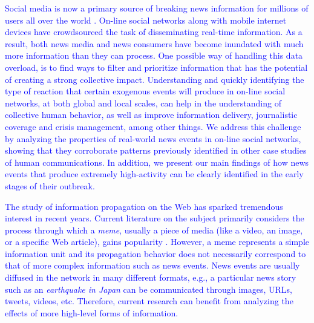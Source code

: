 \documentclass[10pt,letterpaper]{article}
\begin{document}
\textcolor{blue}{Social media is now a primary source of breaking news information
for millions of users all over the world \cite{Kwak:2010}. On-line
social networks along with mobile internet devices have crowdsourced
the task of disseminating real-time information. As a result, both
news media and news consumers have become inundated with much more
information than they can process. One possible way of handling this data overload, is
to find ways to filter and prioritize information that has the
potential of creating a strong collective impact. Understanding and
quickly identifying the type of reaction that certain exogenous events will produce
in on-line social networks, at both global and local scales, can help
in the understanding of collective human behavior, as well as
improve information delivery, journalistic coverage and
crisis management, among other things. We
address this challenge by analyzing the properties of real-world news
events in on-line social networks, showing that they corroborate patterns
previously identified in other case studies of human communications. In
addition, we present our main findings of how news events that produce
extremely high-activity can be clearly identified in the early stages of
their outbreak.}


\textcolor{blue}{The study of information propagation on the Web has sparked tremendous
interest in recent years. Current literature on the subject primarily
considers the process through which a {\em meme}, usually a piece of
media (like a video, an image, or a specific Web article), gains
popularity
\cite{Castillo:2014,Szabo:2010,Lerman:2010,Tatar2014,Pinto:2013,Ahmed:2013,Li:2016:concept:drift,
Liu:2015:UN}.  
However, a meme represents a
simple information unit and its propagation behavior does not necessarily
correspond to that of more complex information such as
news events. News events are usually diffused in the network in many
different formats, e.g., a particular news story such as an {\em
  earthquake in Japan} can be communicated through images, URLs,
tweets, videos, etc. Therefore, current research can benefit from analyzing
the effects of more high-level forms of information.} 
\end{document}
